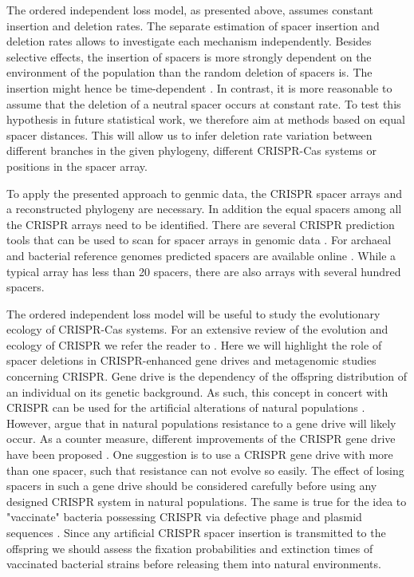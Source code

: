 \documentclass[preprint,authoryear]{elsarticle}
\theoremstyle{definition}
\numberwithin{equation}{section}
\numberwithin{figure}{section}
\begin{document}
The ordered independent loss model, as presented above, assumes constant insertion and deletion rates.
The separate estimation of spacer insertion and deletion rates allows to investigate each mechanism independently.
Besides selective effects, 
the insertion of spacers is more strongly dependent on the environment of the population than the random deletion of spacers is.
The insertion might hence be time-dependent \citep{Hynes2016applicationsofCRISPRinnature}.
In contrast, it is more reasonable to assume that the deletion of a neutral spacer occurs at constant rate.
To test this hypothesis in future statistical work, we therefore aim at methods based on equal spacer distances.
This will allow us to infer deletion rate variation between different branches in the given phylogeny,
different CRISPR-Cas systems or positions in the spacer array.

To apply the presented approach to genmic data, the CRISPR spacer arrays and a reconstructed phylogeny are necessary.
In addition the equal spacers among all the CRISPR arrays need to be identified.
There are several CRISPR prediction tools that can be used to scan for spacer arrays in genomic data \citep{Bland2007,Edgar2007,Grissa2007finder}.
For archaeal and bacterial reference genomes predicted spacers are available online \citep{Grissa2007database}.
While a typical array has less than 20 spacers, there are also arrays with several hundred spacers.

The ordered independent loss model will be useful to study the evolutionary ecology of CRISPR-Cas systems.
For an extensive review of the evolution and ecology of CRISPR we refer the reader to \cite{Westra2016}.
Here we will highlight the role of spacer deletions in CRISPR-enhanced gene drives and metagenomic studies concerning CRISPR.
Gene drive is the dependency of the offspring distribution of an individual on its genetic background. As such, this concept in concert with CRISPR
can be used for the artificial alterations of natural populations \citep{Burt2003,Hynes2016applicationsofCRISPRinnature}.
However,  \cite{Unckless2017} argue that in natural populations resistance to a gene drive will likely occur.
As a counter measure, different improvements of the CRISPR gene drive have been proposed \citep{Esvelt2014}.
One suggestion is to use a CRISPR gene drive with more than one spacer, such that resistance can not evolve so easily.
The effect of losing spacers in such a gene drive should be considered carefully before using any designed CRISPR system in natural populations.
The same is true for the idea to "vaccinate" bacteria possessing CRISPR via defective phage and plasmid sequences \citep{Hynes2014,Hynes2016programmingCRISPR}.
Since any artificial CRISPR spacer insertion is transmitted to the offspring we should assess the fixation probabilities and extinction times
of vaccinated bacterial strains before releasing them into natural environments.
\end{document}
